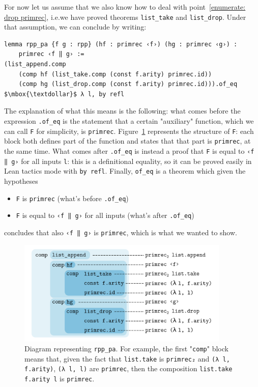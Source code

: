 \documentclass[preprint]{elsarticle}
\theoremstyle{remark}
\newcommand{\LEAN}{\textsf{Lean}\xspace}
\begin{document}
\vspace{\baselineskip}
For now let us assume that we also know how to deal with point~\ref{enumerate: drop primrec}, i.e.\@ we have proved theorems \lstinline|list_take| and \lstinline|list_drop|. Under that assumption, we can conclude by writing:
\begin{lstlisting}
lemma rpp_pa {f g : rpp} (hf : primrec ‹f›) (hg : primrec ‹g›) :
    primrec ‹f ‖ g› :=
(list_append.comp
    (comp hf (list_take.comp (const f.arity) primrec.id))
    (comp hg (list_drop.comp (const f.arity) primrec.id))).of_eq
$\mbox{\textdollar}$ λ l, by refl
\end{lstlisting}
\noindent
The explanation of what this means is the following: what comes before the expression \lstinline|.of_eq| is the statement that a certain "auxiliary" function, which we can call \lstinline|F| for simplicity, is \lstinline|primrec|. Figure~\ref{fig:rpp_pa} represents the structure of \lstinline|F|: each block both defines part of the function and states that that part is \lstinline|primrec|, at the same time. What comes after \lstinline|.of_eq| is instead a proof that \lstinline|F| is equal to \lstinline|‹f ‖ g›| for all inputs \lstinline|l|: this is a definitional equality, so it can be proved easily in \LEAN tactics mode with \lstinline|by refl|. Finally, \lstinline|of_eq| is a theorem which given the hypotheses
\begin{itemize}
\item \lstinline|F| is \lstinline|primrec| (what's before \lstinline|.of_eq|)
\item \lstinline|F| is equal to \lstinline|‹f ‖ g›| for all inputs (what's after \lstinline|.of_eq|)
\end{itemize}
concludes that also \lstinline|‹f ‖ g›| is \lstinline|primrec|, which is what we wanted to show.
\begin{figure}[H]
    \centering
    \includegraphics[width=0.9\textwidth]{drawing.png}
    \caption{Diagram representing \lstinline|rpp_pa|. For example, the first "\lstinline|comp|" block means that, given the fact that \lstinline|list.take| is \lstinline|primrec₂| and \lstinline|(λ l, f.arity)|, \lstinline|(λ l, l)| are \lstinline|primrec|, then the composition \lstinline|list.take f.arity l| is \lstinline|primrec|.}
    \label{fig:rpp_pa}
\end{figure}
\end{document}
